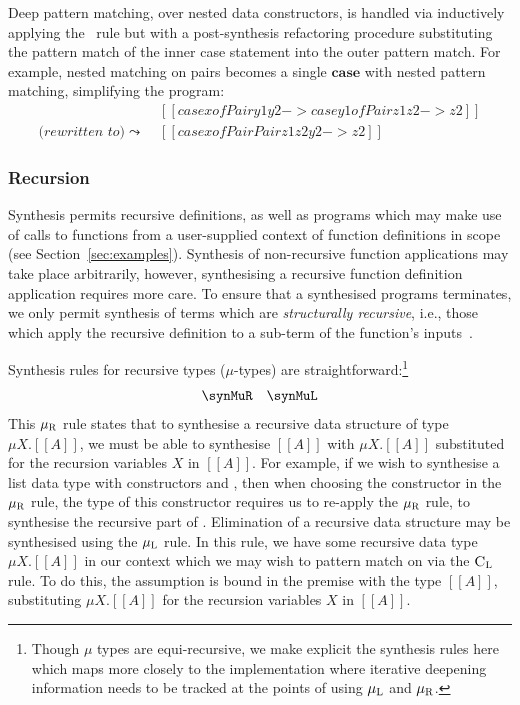 Deep pattern matching, over nested data constructors, is handled via inductively
applying the \GRANULEdruleCaseName\ rule but with a post-synthesis refactoring
procedure substituting the pattern match of the inner case statement into the
outer pattern match. For example, nested matching on pairs becomes a single
$\textbf{case}$ with nested pattern matching, simplifying the program:
\begin{align*}
         &  [[ case x of Pair y1 y2 -> case y1 of Pair z1 z2 -> z2 ]] \\
\textit{(rewritten to)} \; \leadsto \;\; &  [[ case x of Pair {Pair z1 z2} y2 -> z2 ]]
\end{align*}


\subsubsection{Recursion}

Synthesis permits recursive definitions, as well as programs which may make use
of calls to functions from a user-supplied context of function definitions in
scope (see Section~\ref{sec:examples}). Synthesis of non-recursive function
applications may take place arbitrarily, however, synthesising a recursive
function definition application requires more care. To ensure that a synthesised
programs terminates, we only permit synthesis of terms which are
\textit{structurally recursive}, i.e., those which apply the recursive
definition to a sub-term of the function's inputs~\citep{oserathesis}.

Synthesis rules for recursive types ($\mu$-types) are
straightforward:\footnote{Though $\mu$ types are equi-recursive, we make
explicit the synthesis rules here which maps more closely to the implementation
where iterative deepening information needs to be tracked at the points of using
$\mu_\textsc{L}$ and  $\mu_\textsc{R}$.}
\begin{align*}
  \begin{array}{cc}
  \synMuR & \synMuL
  \end{array}
\end{align*}
This $\mu_\textsc{R}$ rule states that to synthesise a recursive data structure
of type $\mu X . [[ A ]]$, we must be able to synthesise $[[ A ]]$ with $\mu X .
[[ A ]]$ substituted for the recursion variables $X$ in $[[ A ]]$. For example,
if we wish to synthesise a list data type  with constructors
 and , then when choosing the 
constructor in the $\mu_\textsc{R}$ rule, the type of this constructor requires
us to re-apply the $\mu_\textsc{R}$ rule, to synthesise the recursive part of
. Elimination of a recursive data structure may be synthesised
using the $\mu_\textsc{L}$ rule. In this rule, we have some recursive data type
$\mu X . [[ A ]]$ in our context which we may wish to pattern match on via the
$\textsc{C}_\textsc{L}$ rule. To do this, the assumption is bound in the premise
with the type $[[ A ]]$, substituting $\mu X. [[ A]]$ for the recursion
variables $X$ in $[[ A ]]$.

